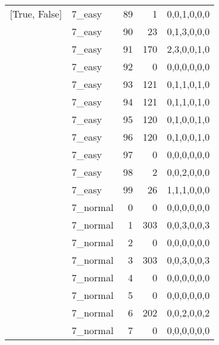 \begin{tabular}{llrrl}
 [True, False]   & 7\_easy              &            89 &                     1 & 0,0,1,0,0,0   \\
 [True, False]   & 7\_easy              &            90 &                    23 & 0,1,3,0,0,0   \\
 [True, False]   & 7\_easy              &            91 &                   170 & 2,3,0,0,1,0   \\
 [True, False]   & 7\_easy              &            92 &                     0 & 0,0,0,0,0,0   \\
 [True, False]   & 7\_easy              &            93 &                   121 & 0,1,1,0,1,0   \\
 [True, False]   & 7\_easy              &            94 &                   121 & 0,1,1,0,1,0   \\
 [True, False]   & 7\_easy              &            95 &                   120 & 0,1,0,0,1,0   \\
 [True, False]   & 7\_easy              &            96 &                   120 & 0,1,0,0,1,0   \\
 [True, False]   & 7\_easy              &            97 &                     0 & 0,0,0,0,0,0   \\
 [True, False]   & 7\_easy              &            98 &                     2 & 0,0,2,0,0,0   \\
 [True, False]   & 7\_easy              &            99 &                    26 & 1,1,1,0,0,0   \\
 [True, False]   & 7\_normal            &             0 &                     0 & 0,0,0,0,0,0   \\
 [True, False]   & 7\_normal            &             1 &                   303 & 0,0,3,0,0,3   \\
 [True, False]   & 7\_normal            &             2 &                     0 & 0,0,0,0,0,0   \\
 [True, False]   & 7\_normal            &             3 &                   303 & 0,0,3,0,0,3   \\
 [True, False]   & 7\_normal            &             4 &                     0 & 0,0,0,0,0,0   \\
 [True, False]   & 7\_normal            &             5 &                     0 & 0,0,0,0,0,0   \\
 [True, False]   & 7\_normal            &             6 &                   202 & 0,0,2,0,0,2   \\
 [True, False]   & 7\_normal            &             7 &                     0 & 0,0,0,0,0,0   \\

\end{tabular}
